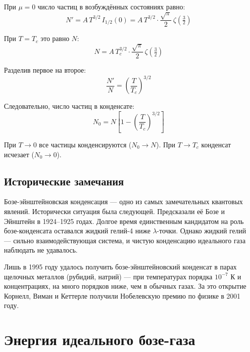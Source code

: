 \documentclass[../general/general]{subfiles}
\begin{document}
При $\mu = 0$ число частиц в возбуждённых состояниях равно:
\begin{equation}
    N' = A\,T^{3/2}\,I_{1/2}(0) = A\,T^{3/2}\cdot\frac{\sqrt{\pi}}{2}\,\zeta\!\left(\tfrac{3}{2}\right)
\end{equation}

При $T = T_c$ это равно $N$:
\begin{equation}
    N = A\,T_c^{3/2}\cdot\frac{\sqrt{\pi}}{2}\,\zeta\!\left(\tfrac{3}{2}\right)
\end{equation}

Разделив первое на второе:
\begin{equation}
    \frac{N'}{N} = \left(\frac{T}{T_c}\right)^{3/2}
\end{equation}

Следовательно, число частиц в конденсате:
\begin{equation}
    \boxed{N_0 = N\left[1 - \left(\frac{T}{T_c}\right)^{3/2}\right]}
    \label{eq:N0}
\end{equation}

При $T \to 0$ все частицы конденсируются ($N_0 \to N$). При $T \to T_c$ конденсат исчезает ($N_0 \to 0$).

\subsection{Исторические замечания}

Бозе-эйнштейновская конденсация --- одно из самых замечательных квантовых явлений. Исторически ситуация была следующей. Предсказали её Бозе и Эйнштейн в 1924--1925 годах. Долгое время единственным кандидатом на роль бозе-конденсата оставался жидкий гелий-4 ниже $\lambda$-точки. Однако жидкий гелий --- сильно взаимодействующая система, и чистую конденсацию идеального газа наблюдать не удавалось.

Лишь в 1995 году удалось получить бозе-эйнштейновский конденсат в парах щелочных металлов (рубидий, натрий) --- при температурах порядка $10^{-7}$ К и концентрациях, на много порядков ниже, чем в обычных газах. За это открытие Корнелл, Виман и Кеттерле получили Нобелевскую премию по физике в 2001 году.



\section{Энергия идеального бозе-газа}
\end{document}
